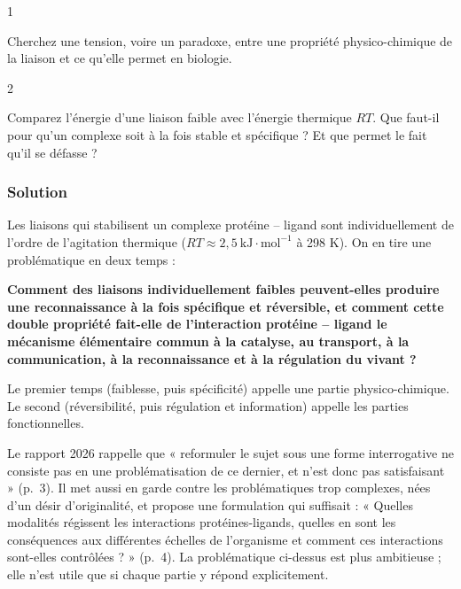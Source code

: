 \documentclass[11pt,a4paper]{article}
\begin{document}
\begin{indication}{1}

Cherchez une tension, voire un paradoxe, entre une propriété physico-chimique de la liaison et ce qu'elle permet en biologie.

\end{indication}

\begin{indication}{2}

Comparez l'énergie d'une liaison faible avec l'énergie thermique \(RT\). Que faut-il pour qu'un complexe soit à la fois stable et spécifique ? Et que permet le fait qu'il se défasse ?

\end{indication}

\hypertarget{solution-1}{%
\subsubsection{Solution}\label{solution-1}}

Les liaisons qui stabilisent un complexe protéine -- ligand sont individuellement de l'ordre de l'agitation thermique (\(RT \approx 2{,}5\ \mathrm{kJ\cdot mol^{-1}}\) à 298 K). On en tire une problématique en deux temps :

\textbf{Comment des liaisons individuellement faibles peuvent-elles produire une reconnaissance à la fois spécifique et réversible, et comment cette double propriété fait-elle de l'interaction protéine -- ligand le mécanisme élémentaire commun à la catalyse, au transport, à la communication, à la reconnaissance et à la régulation du vivant ?}

Le premier temps (faiblesse, puis spécificité) appelle une partie physico-chimique. Le second (réversibilité, puis régulation et information) appelle les parties fonctionnelles.

\begin{jury}

Le rapport 2026 rappelle que « reformuler le sujet sous une forme interrogative ne consiste pas en une problématisation de ce dernier, et n'est donc pas satisfaisant » (p.~3). Il met aussi en garde contre les problématiques trop complexes, nées d'un désir d'originalité, et propose une formulation qui suffisait : « Quelles modalités régissent les interactions protéines-ligands, quelles en sont les conséquences aux différentes échelles de l'organisme et comment ces interactions sont-elles contrôlées ? » (p.~4). La problématique ci-dessus est plus ambitieuse ; elle n'est utile que si chaque partie y répond explicitement.

\end{jury}
\end{document}
